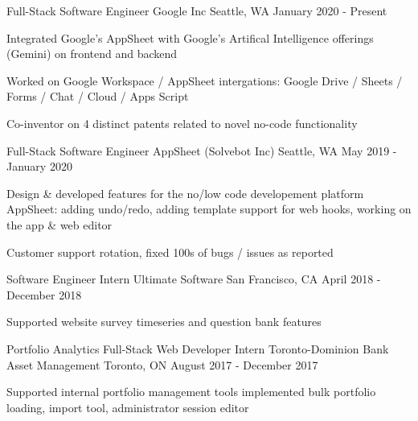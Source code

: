

\addvspace{1ex}

\begin{cventries}

\cventry
{Full-Stack Software Engineer} %
{Google Inc} %
{Seattle, WA} %
{January 2020 - Present} %
{ %
\begin{cvitems}
\item {Integrated Google's AppSheet with Google's Artifical Intelligence offerings (Gemini) on frontend and backend}
\item {Worked on Google Workspace / AppSheet intergations: Google Drive / Sheets / Forms / Chat / Cloud / Apps Script}
\item {Co-inventor on 4 distinct patents related to novel no-code functionality}
\end{cvitems}
}

\cventry
{Full-Stack Software Engineer} %
{AppSheet (Solvebot Inc)} %
{Seattle, WA} %
{May 2019 - January 2020} %
{ %
\begin{cvitems}
\item {Design \& developed features for the no/low code developement platform AppSheet: adding undo/redo, adding template support for web hooks, working on the app \& web editor}
\item {Customer support rotation, fixed 100s of bugs / issues as reported}
\end{cvitems}
}

\cventry
{Software Engineer Intern} %
{Ultimate Software} %
{San Francisco, CA} %
{April 2018 - December 2018} %
{ %
\begin{cvitems}
\item {Supported website survey timeseries and question bank features}
\end{cvitems}
}

\cventry
{Portfolio Analytics Full-Stack Web Developer Intern} %
{Toronto-Dominion Bank Asset Management} %
{Toronto, ON} %
{August 2017 - December 2017} %
{ %
\begin{cvitems}
\item {Supported internal portfolio management tools implemented bulk portfolio loading, import tool, administrator session editor}
\end{cvitems}
}


\end{cventries}
